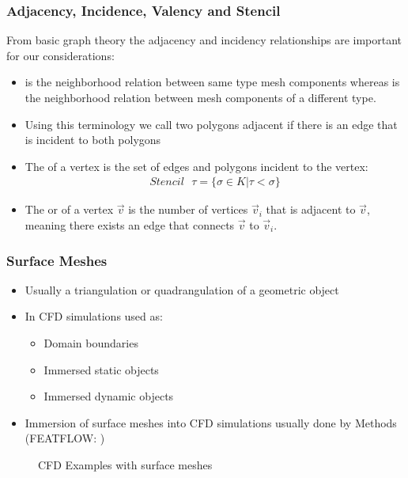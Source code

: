 \begin{frame}
  \frametitle{Adjacency, Incidence, Valency and Stencil}
From basic graph theory the adjacency and incidency relationships are important for our
considerations:
		\begin{itemize}
			\item {} is the neighborhood relation between same type mesh components whereas  is the neighborhood relation between mesh components of
a different type.
			\item Using this terminology we call two polygons adjacent if there is an edge that is incident to both polygons
							 
 
\item The  of a vertex is the set of edges and polygons incident to the vertex:
\begin{align*}
  Stencil \text{ } \tau = \{\sigma \in K| \tau < \sigma \}
\end{align*}
\item The  or  of a vertex $\vec{v}$ is the number of vertices $\vec{v}_i$ that is adjacent to $\vec{v}$, meaning there exists an edge that connects $\vec{v}$ to $\vec{v}_i$.
\end{itemize}
\end{frame}

\begin{frame}
  \frametitle{Surface Meshes}
\begin{itemize}
\item Usually a triangulation or quadrangulation of a geometric object
\item In CFD simulations used as:
	\begin{itemize}
	  \item Domain boundaries
	  \item Immersed static objects		
	  \item Immersed dynamic objects				
	\end{itemize}
\item Immersion of surface meshes into CFD simulations usually done by  Methods (FEATFLOW: )
\end{itemize}
\begin{figure}[h!]
\centering
{}%
\caption{CFD Examples with surface meshes}
\label{fig:liquid-solid}
\end{figure}
\end{frame}

